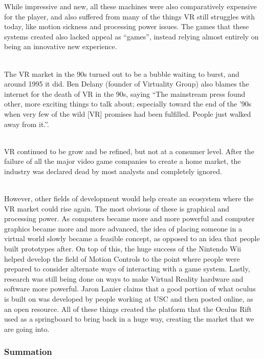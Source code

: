 \documentclass[a4paper,10pt]{article}
\begin{document}
	While impressive and new, all these machines were also comparatively expensive for the player, and also suffered from many of the things VR still struggles with today, like motion sickness and processing power issues.  The games that these systems created also lacked appeal as “games”, instead relying almost entirely on being an innovative new experience.  
		\par ~\\
	The VR market in the 90s turned out to be a bubble waiting to burst, and around 1995 it did.  Ben Delany (founder of Virtuality Group) also blames the internet for the death of VR in the 90s, saying “The mainstream press found other, more exciting things to talk about; especially toward the end of the ’90s when very few of the wild [VR] promises had been fulfilled. People just walked away from it.”.\cite{vergeVr}
			\par ~\\
	VR continued to be grow and be refined, but not at a consumer level.  After the failure of all the major video game companies to create a home market, the industry was declared dead by most analysts and completely ignored.  
		\par ~\\
	However, other fields of development would help create an ecosystem where the VR market could rise again.  The most obvious of these is graphical and processing power. 
	As computers became more and more powerful and computer graphics became more and more advanced, the idea of placing someone in a virtual world slowly became a feasible concept,
	as opposed to an idea that people built prototypes after.  On top of this, the huge success of the Nintendo Wii helped develop the field of Motion Controls to the point where 
	people were prepared to consider alternate ways of interacting with a game system.  Lastly, research was still being done on ways to make Virtual Reality hardware and software 
	more powerful.  Jaron Lanier claims that a good portion of what oculus is built on was developed by people working at USC and then posted online, as an open resource.\cite{vergeVr} 
	All of these things created the platform that the Oculus Rift used as a springboard to bring back in a huge way, creating the market that we are going into.
	\subsubsection{Summation}
	
\end{document}
